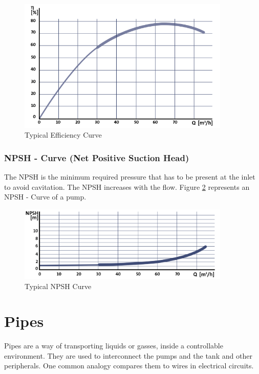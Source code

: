 \begin{figure}[h]
	\centering
	\includegraphics[width=0.9\textwidth]{figures/03physicalSetup/typicalEfficiencyCurve.PNG}
	\caption{Typical Efficiency Curve}
	\label{fig:typicalEfficiencyCurve}
\end{figure}

\subsubsection{NPSH - Curve (Net Positive Suction Head)}
The NPSH is the minimum required pressure that has to be present at the inlet to avoid cavitation.
The NPSH increases with the flow. Figure \ref{fig:typicalNPSHCurve} represents an NPSH - Curve
of a pump.

\begin{figure}[h]
	\centering
	\includegraphics[width=0.9\textwidth]{figures/03physicalSetup/typicalNPSHCurve.PNG}
	\caption{Typical NPSH Curve}
	\label{fig:typicalNPSHCurve}
\end{figure}

\section{Pipes}
Pipes are a way of transporting liquids or gasses, inside a controllable environment.
They are used to interconnect the pumps and the tank and other peripherals.
One common analogy compares them to wires in electrical circuits.


